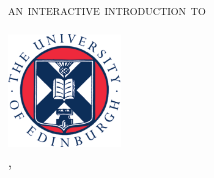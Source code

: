 \begin{titlepage}	
    \begin{center}
    		\hfill
        \vspace{50mm}        
     
        \begingroup
            \color{Maroon}\LARGE{\textsc{an interactive introduction to}} \\ \medskip
            \color{Maroon}\Huge{\textsc{\mlab}} 
            
        \endgroup
        
		\vfill
        
        \includegraphics[width=3cm]{Graphics/General/UoE_logo} \\   
		\myUni, \mySchool \\
		 \textcopyright\ \myTime                  
    \end{center}
\end{titlepage}   